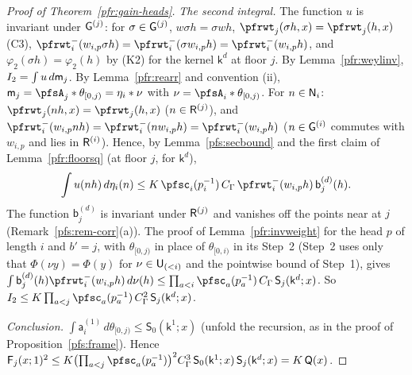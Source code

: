 \documentclass[10pt]{amsart}
\theoremstyle{definition}
\theoremstyle{remark}
\providecommand{\auU}{\mathrm U}
\begin{document}
\begin{proof}[Proof of Theorem~\ref{pfr:gain-heads}]
\emph{The second integral.} The function $u$ is invariant under $\pfrG^{(j)}$: for $\sigma\in\pfrG^{(j)}$, $w\sigma h=\sigma wh$, $\pfrwt_j(\sigma h,x)=
\pfrwt_j(h,x)$ (C3), $\pfrwt^-_i(w_{i,p}\sigma h)=\pfrwt^-_i(\sigma w_{i,p}h)=\pfrwt^-_i(w_{i,p}h)$, and $\varphi_2(\sigma h)=\varphi_2(h)$ by (K2) for the
kernel $\mathsf k^d$ at floor $j$. By Lemma~\ref{pfr:weylinv}, $I_2=\int u\,d\pfrm_j$. By Lemma~\ref{pfr:rearr} and convention (ii),
$\pfrm_j=\pfsA_j*\theta_{[0,j)}=\eta_i*\nu$ with $\nu=\pfsA_i*\theta_{[0,j)}$. For $n\in\pfrN_i$: $\pfrwt_j(nh,x)=\pfrwt_j(h,x)$ ($n\in\pfrR^{(j)}$),
and $\pfrwt^-_i(w_{i,p}nh)=\pfrwt^-_i(nw_{i,p}h)=\pfrwt^-_i(w_{i,p}h)$ ($n\in\pfrG^{(i)}$ commutes with $w_{i,p}$ and lies in $\pfrR^{(i)}$). Hence, by
Lemma~\ref{pfs:secbound} and the first claim of Lemma~\ref{pfr:floorsq} (at floor $j$, for $\mathsf k^d$),
\[
\int u(nh)\,d\eta_i(n)\le K\,\pfsc_i(p_i^{-1})\,C_\Gamma\,\pfrwt^-_i(w_{i,p}h)\,\mathsf b^{(d)}_j(h).
\]
The function $\mathsf b^{(d)}_j$ is invariant under $\pfrR^{(j)}$ and vanishes off the points near at $j$ (Remark~\ref{pfs:rem-corr}(a)). The
proof of Lemma~\ref{pfr:invweight} for the head $p$ of length $i$ and $b'=j$, with $\theta_{[0,j)}$ in place of $\theta_{[0,i)}$ in its Step~2
(Step~2 uses only that $\Phi(\nu y)=\Phi(y)$ for $\nu\in\pfrU_{(<i)}$ and the pointwise bound of Step~1), gives
$\int\mathsf b^{(d)}_j(h)\pfrwt^-_i(w_{i,p}h)\,d\nu(h)\le\prod_{a<i}\pfsc_a(p_a^{-1})\,C_\Gamma\,\mathsf S_j(\mathsf k^d;x)$. So
$I_2\le K\prod_{a<j}\pfsc_a(p_a^{-1})\,C_\Gamma^2\,\mathsf S_j(\mathsf k^d;x)$.

\emph{Conclusion.} $\int\mathsf a^{(1)}_i\,d\theta_{[0,j)}\le\mathsf S_0(\mathsf k^1;x)$ (unfold the recursion, as in the proof of
Proposition~\ref{pfs:frame}). Hence $\pfrF_j(x;1)^2\le K\bigl(\prod_{a<j}\pfsc_a(p_a^{-1})\bigr)^2C_\Gamma^3\,\mathsf S_0(\mathsf k^1;x)\,\mathsf S_j(\mathsf k^d;x)=
K\,\mathsf Q(x)$.
\end{proof}





\providecommand{\panot}[1]{\par\smallskip{\raggedright\noindent\textbf{[Not proved here:} #1\textbf{]}\par}\smallskip}
\providecommand{\pbdeg}{\operatorname{deg}}
\providecommand{\pbvol}{\operatorname{vol}}
\providecommand{\pbmTh}{\Theta}
\providecommand{\pfrG}{\mathsf G}
\providecommand{\pfrH}{\mathsf H}
\providecommand{\pfrU}{\mathsf U}
\providecommand{\pfrR}{\mathsf R}
\providecommand{\pfrM}{\mathsf M}
\providecommand{\pfrm}{\mathsf m}
\providecommand{\pfrK}{\mathsf K}
\providecommand{\pfrP}{\mathcal P}
\providecommand{\pfrCl}{\mathcal C}
\providecommand{\pfrI}{\mathcal I}
\providecommand{\pfrF}{\mathsf F}
\providecommand{\pfrB}{\mathsf B}
\providecommand{\pfrdep}{\operatorname{dp}}
\providecommand{\pfrkap}{\kappa}
\providecommand{\pfrN}{\mathsf N}
\providecommand{\pfrX}{\Xi}
\providecommand{\pfrip}[2]{\langle#1,#2\rangle}
\providecommand{\pfrell}{\ell}
\providecommand{\prpD}{\mathsf D}
\providecommand{\prpvolU}[1]{\pbvol\auU(#1)}
\providecommand{\prpdens}{\mathsf h}
\end{document}
